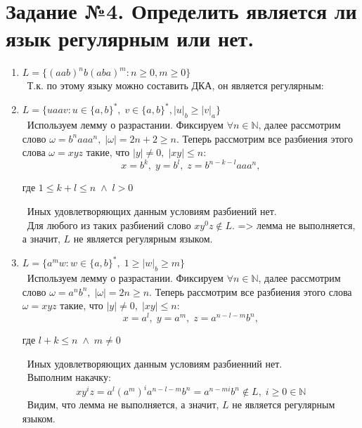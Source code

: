 \documentclass{article}
\begin{document}
\section{Задание №4. Определить является ли язык регулярным или нет.}
\begin{enumerate}
\item \(L=\{(aab)^{n}b(aba)^{m} : n \geqslant 0, m \geqslant 0\}\)\\
\ Т.к. по этому языку можно составить ДКА, он является регулярным: \\
\begin{center}
\end{center}

\item \(L = \{uaav : u \in \{a, b\}^*, \; v \in \{a, b\}^*, |u|_b \geqslant |v|_a\}\)\\
\ Используем лемму о разрастании. Фиксируем \(\forall n \in \mathbb{N} \), далее рассмотрим слово \(\omega = b^{n}aaa^{n}, \; |\omega| = 2n + 2 \geq n\). Теперь рассмотрим все разбиения этого слова \(\omega = xyz\) такие, что \(|y| \neq 0, \; |xy| \leq n\): \\
$$x = b^{k}, \; y = b^{l}, \; z = b^{n - k - l}aaa^n,$$ 
\begin{center}
где \(1 \leq k + l \leq n \; \wedge \; l > 0\)
\end{center}
\ Иных удовлетворяющих данным условиям разбиений нет. \\
\ Для любого из таких разбиений слово \(xy^0z \notin L\). => лемма не выполняется, а значит, \(L\) не является регулярным языком. \\

\item \(L = \{a^mw : w \in \{a, b\}^{*}, \; 1 \geqslant |w|_b \geqslant m\}\)\\
\ Используем лемму о разрастании. Фиксируем \(\forall n \in \mathbb{N} \), далее рассмотрим слово \(\omega = a^nb^n, \; |\omega| = 2n \geqslant n\). Теперь рассмотрим все разбиения этого слова \(\omega = xyz\) такие, что \(|y| \neq 0, \; |xy| \leq n\): \\
$$x = a^{l}, \; y = a^{m}, \; z = a^{n-l-m}b^{n},$$ 
\begin{center}
где \(l + k \leqslant n \; \wedge \; m \ne 0\)
\end{center} 
\ Иных удовлетворяющих данным условиям разбиенний нет. \\ 
\ Выполним накачку: \\
$$xy^{i}z = a^{l}(a^{m})^{i}a^{n-l-m}b^{n} = a^{n-mi}b^{n} \notin L, \; i 
\geqslant 0 \in \mathbb{N} $$
\ Видим, что лемма не выполняется, а значит, \(L\) не является регулярным языком. \\


\end{enumerate}
\end{document}
